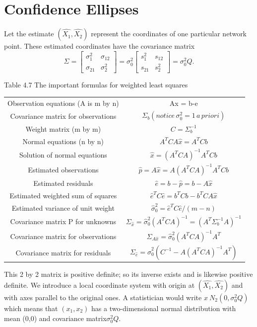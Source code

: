 \section{Confidence Ellipses}
Let the estimate $(\hat{X_1},\hat{X_2})$ represent the coordinates of one particular network point. These estimated coordinates have the covariance matrix
\begin{equation}
\Sigma=
\begin{bmatrix}
\sigma^2_1 & \sigma_{12}\\
\sigma_{21} & \sigma^2_2
\end{bmatrix}
=\sigma^2_0
\begin{bmatrix}
s^2_1 & s_{12}\\
s_{21} & s^2_2
\end{bmatrix}
=\sigma^2_0Q.
\end{equation}

\begin{table}
Table 4.7\; The important formulas for weighted least squares
\centering
\begin{tabular}{c c}
	\hline 
	Observation equations (A is m by n)& Ax = b-e \\ 
	Covariance matrix for observations&  $\Sigma_b(notice\,\sigma^2_0=1\,a\,priori)$  \\
	Weight matrix (m by m)&   $C=\Sigma^{-1}_b$\\
	Normal equations (n by n)&  $A^TCA\hat{x}=A^TCb$ \\
	Solution of normal equations&   $\hat{x}=(A^TCA)^{-1}A^TCb$\\
	Estimated observations&   $\hat{p}=A\hat{x}=A(A^TCA)^{-1}A^TCb$\\
	Estimated residuals &   $\hat{e}=b-\hat{p}=b-A\hat{x}$\\
	Estimated weighted sum of squares &   $\hat{e}^TC\hat{e}=b^TCb-b^TCA\hat{x}$\\
	Estimated variance of unit weight&  $\hat{\sigma}^2_0=\hat{e}^TC\hat{e}/(m-n)$\\
	Covariance matrix P for unknowns &   $\Sigma_{\hat{x}}=\hat{\sigma}^2_0(A^TCA)^{-1}=(A^T\Sigma^{-1}_bA)^{-1}$\\
	Covariance matrix for observations& $\Sigma_{A\hat{x}}=\hat{\sigma}^2_0(A^TCA)^{-1}A^T$  \\ 
	Covariance matrix for residuals& $\Sigma_{\hat{e}}=\hat{\sigma}^2_0(C^{-1}-A(A^TCA)^{-1}A^T)$\\  
	\hline 
\end{tabular} 	
\end{table}
This 2 by 2 matrix is positive definite; so its inverse exists and is likewise positive definite.
We introduce a local coordinate system with origin at $(\hat{X_1},\hat{X_2})$ and with axes parallel to the original ones. A statistician would write $x~N_2(0,\sigma^2_0Q)$ which means that $(x_1,x_2)$ has a two-dimensional normal distribution with mean (0,0) and covariance matrix$\sigma^2_0Q$.

